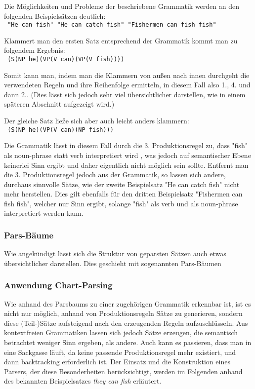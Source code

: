 \documentclass[12pt]{paper}
\begin{document}
Die Möglichkeiten und Probleme der beschriebene Grammatik werden an den folgenden Beispielsätzen deutlich:
\\

\tt
"He can fish"
"He can catch fish"
"Fishermen can fish fish"
\rm

Klammert man den ersten Satz entsprechend der Grammatik kommt man zu folgendem Ergebnis:\\

\tt 
(S(NP he)(VP(V can)(VP(V fish))))\\
\rm

Somit kann man, indem man die Klammern von außen nach innen durchgeht die verwendeten Regeln und ihre Reihenfolge ermitteln, in diesem Fall also 1., 4. und dann 2.. (Dies lässt sich jedoch sehr viel übersichtlicher darstellen, wie in einem späteren Abschnitt aufgezeigt wird.)

Der gleiche Satz ließe sich aber auch leicht anders klammern:\\

\tt
(S(NP he)(VP(V can)(NP fish)))\\
\rm

Die Grammatik lässt in diesem Fall durch die 3. Produktionsregel zu, dass "fish" als noun-phrase statt verb interpretiert wird , was jedoch auf semantischer Ebene keinerlei Sinn ergibt und daher eigentlich nicht möglich sein sollte. Entfernt man die 3. Produktionsregel jedoch aus der Grammatik, so lassen sich andere, durchaus sinnvolle Sätze, wie der zweite Beispielsatz "He can catch fish" nicht mehr herstellen. Dies gilt ebenfalls für den dritten Beispielsatz "Fishermen can fish fish", welcher nur Sinn ergibt, solange "fish" als verb und als noun-phrase interpretiert werden kann.

\subsubsection{Pars-Bäume} 

Wie angekündigt lässt sich die Struktur von geparsten Sätzen auch etwas übersichtlicher darstellen. Dies geschieht mit sogenannten Pars-Bäumen

\subsubsection{Anwendung Chart-Parsing}
Wie anhand des Parsbaums zu einer zugehörigen Grammatik erkennbar ist, ist es nicht nur möglich, anhand von Produktionsregeln Sätze zu generieren, sondern diese (Teil-)Sätze aufsteigend nach den erzeugenden Regeln aufzuschlüsseln. Aus kontextfreien Grammatiken lassen sich jedoch Sätze erzeugen, die semantisch betrachtet weniger Sinn ergeben, als andere. Auch kann es passieren, dass man in eine Sackgasse läuft, da keine passende Produktionsregel mehr existiert, und dann backtracking erforderlich ist. Der Einsatz und die Konstruktion eines Parsers, der diese Besonderheiten berücksichtigt, werden im Folgenden anhand des bekannten Beispielsatzes \textit{they can fish} erläutert.
\end{document}
